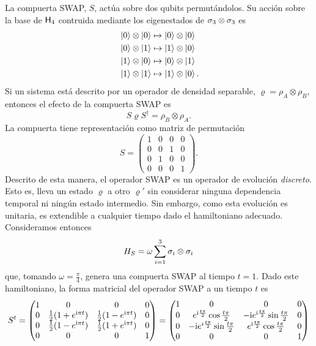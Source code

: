 La compuerta SWAP, $S$, actúa sobre dos qubits permutándolos. Su acción sobre la base de ${\sf H}_{4}$ contruida mediante los eigenestados de $\sigma_{3}\otimes\sigma_{3}$ es
\begin{align*}
    \ket{0}\otimes\ket{0}&\mapsto\ket{0}\otimes\ket{0}\\
    \ket{0}\otimes\ket{1}&\mapsto\ket{1}\otimes\ket{0}\\
    \ket{1}\otimes\ket{0}&\mapsto\ket{0}\otimes\ket{1}\\
    \ket{1}\otimes\ket{1}&\mapsto\ket{1}\otimes\ket{0} \rlap{.}
\end{align*}
Si un sistema está descrito por un operador de densidad separable, $\varrho=\rho_{A}\otimes\rho_{B}$, entonces el efecto de la compuerta SWAP es 
\begin{equation*}
    S\varrho S^{\dag}=\rho_{B}\otimes\rho_{A}.
\end{equation*}
La compuerta tiene representación como matriz de permutación
\begin{equation*}
    S=\begin{pmatrix}
        1&0&0&0\\
        0&0&1&0\\
        0&1&0&0\\
        0&0&0&1
    \end{pmatrix}.
\end{equation*}
Descrito de esta manera, el operador SWAP es un operador de evolución \textit{discreto}. Esto es, lleva un estado $\varrho$ a otro $\varrho'$ sin considerar ninguna dependencia temporal ni ningún estado intermedio. Sin embargo, como esta evolución es unitaria, es extendible a cualquier tiempo dado el hamiltoniano adecuado. Consideramos entonces
\begin{equation*}
  H_{S}=\omega\sum_{i=1}^{3}\sigma_{i}\otimes\sigma_{i}
\end{equation*}
que, tomando $\omega=\frac{\pi}{4}$, genera una compuerta SWAP al tiempo $t=1$. Dado este hamiltoniano, la forma matricial del operador \textsc{SWAP} a un tiempo $t$ es
\begin{equation}\label{eq:SWAP(t)}
S^{t}=\begin{pmatrix}
 1 & 0 & 0 & 0 \\
 0 & \frac{1}{2}(1+e^{\text{i} \pi t}) & \frac{1}{2} (1-e^{\text{i} \pi t}) & 0 \\
 0 & \frac{1}{2}(1-e^{\text{i} \pi t}) & \frac{1}{2}(1+e^{\text{i} \pi t}) & 0 \\
 0 & 0 & 0 & 1
\end{pmatrix}=\begin{pmatrix}
  1 & 0 & 0 & 0 \\
  0 & e^{\text{i}\frac{t\pi}{2}}\cos{\frac{t\pi}{2}} & -\text{i} e^{\text{i}\frac{t\pi}{2}}\sin{\frac{t\pi}{2}} & 0 \\
  0 & -\text{i} e^{i\frac{t\pi}{2}}\sin{\frac{t\pi}{2}} & e^{\text{i}\frac{t\pi}{2}}\cos{\frac{t\pi}{2}}  & 0 \\
  0 & 0 & 0 & 1
 \end{pmatrix}
\end{equation}

